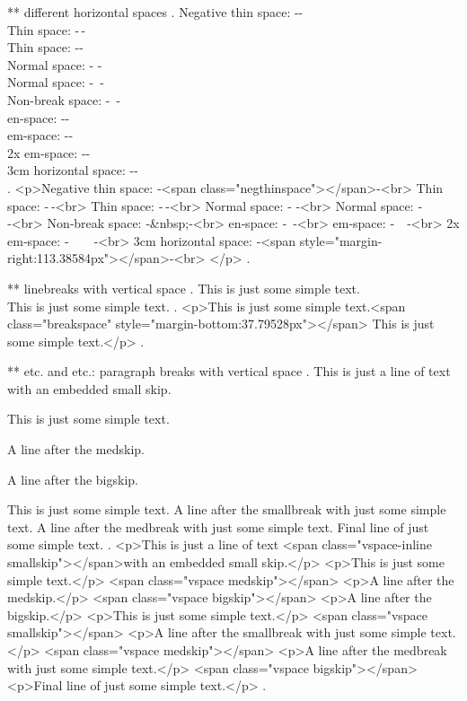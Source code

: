 ** different horizontal spaces
.
Negative thin space: -\negthinspace- \\
Thin space: -\,- \\
Thin space: -\thinspace- \\
Normal space: - - \\
Normal space: -\ - \\
Non-break space: -~- \\
en-space: -\enspace- \\
em-space: -\quad- \\
2x em-space: -\qquad-\\
3cm horizontal space: -\hspace{3cm}- \\
.
<p>Negative thin space: ‐<span class="negthinspace"></span>‐<br>
Thin space: ‐ ‐<br>
Thin space: ‐ ‐<br>
Normal space: ‐ ‐<br>
Normal space: ‐​ ‐<br>
Non‐break space: ‐&nbsp;‐<br>
en‐space: ‐ ‐<br>
em‐space: ‐ ‐<br>
2x em‐space: ‐  ‐<br>
3cm horizontal space: ‐<span style="margin-right:113.38584px"></span>‐<br>
</p>
.


** linebreaks with vertical space
.
This is just some simple text.\\[1cm]
This is just some simple text.
.
<p>This is just some simple text.<span class="breakspace" style="margin-bottom:37.79528px"></span>
This is just some simple text.</p>
.


** \smallskip etc. and \smallbreak etc.: paragraph breaks with vertical space
.
This is just a line of text \smallskip with an embedded small skip.

This is just some simple text.

\medskip
A line after the medskip.

\bigskip

A line after the bigskip.

This is just some simple text.
\smallbreak
A line after the smallbreak with just some simple text.
\medbreak
A line after the medbreak with just some simple text.
\bigbreak
Final line of just some simple text.
.
<p>This is just a line of text <span class="vspace-inline smallskip"></span>with an embedded small skip.</p>
<p>This is just some simple text.</p>
<span class="vspace medskip"></span>
<p>A line after the medskip.</p>
<span class="vspace bigskip"></span>
<p>A line after the bigskip.</p>
<p>This is just some simple text.</p>
<span class="vspace smallskip"></span>
<p>A line after the smallbreak with just some simple text.</p>
<span class="vspace medskip"></span>
<p>A line after the medbreak with just some simple text.</p>
<span class="vspace bigskip"></span>
<p>Final line of just some simple text.</p>
.


